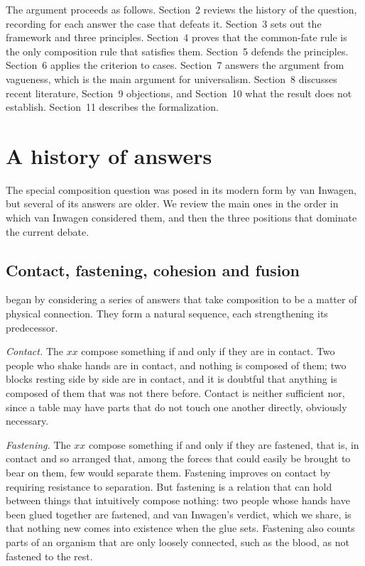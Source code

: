 \documentclass{situationist-preprint}
\begin{document}
The argument proceeds as follows. Section~2 reviews the history of the question, recording for each answer the case that defeats it. Section~3 sets out the framework and three principles. Section~4 proves that the common-fate rule is the only composition rule that satisfies them. Section~5 defends the principles. Section~6 applies the criterion to cases. Section~7 answers the argument from vagueness, which is the main argument for universalism. Section~8 discusses recent literature, Section~9 objections, and Section~10 what the result does not establish. Section~11 describes the formalization.

\section{A history of answers}

The special composition question was posed in its modern form by van Inwagen, but several of its answers are older. We review the main ones in the order in which van Inwagen considered them, and then the three positions that dominate the current debate.

\subsection{Contact, fastening, cohesion and fusion}

\citet{vanInwagen1990} began by considering a series of answers that take composition to be a matter of physical connection. They form a natural sequence, each strengthening its predecessor.

\emph{Contact.} The $xx$ compose something if and only if they are in contact. Two people who shake hands are in contact, and nothing is composed of them; two blocks resting side by side are in contact, and it is doubtful that anything is composed of them that was not there before. Contact is neither sufficient nor, since a table may have parts that do not touch one another directly, obviously necessary.

\emph{Fastening.} The $xx$ compose something if and only if they are fastened, that is, in contact and so arranged that, among the forces that could easily be brought to bear on them, few would separate them. Fastening improves on contact by requiring resistance to separation. But fastening is a relation that can hold between things that intuitively compose nothing: two people whose hands have been glued together are fastened, and van Inwagen's verdict, which we share, is that nothing new comes into existence when the glue sets. Fastening also counts parts of an organism that are only loosely connected, such as the blood, as not fastened to the rest.
\end{document}
